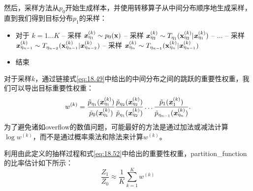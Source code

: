 然后，采样方法从$p_0$开始生成样本，并使用转移算子从中间分布顺序地生成采样，直到我们得到目标分布$p_1$的采样：
\begin{itemize}
	\item 对于 $k=1 \dots K$ 
		\newline
		\quad\quad -- 采样 $ \boldsymbol{\mathit{x}}_{\eta_1}^{(k)} \sim p_0(\mathbf{x}) $
		\newline
		\quad\quad -- 采样 $ \boldsymbol{\mathit{x}}_{\eta_2}^{(k)} \sim T_{\eta_1}(\mathbf{x}_{\eta_2}^{(k)} | \boldsymbol{\mathit{x}}_{\eta_1}^{(k)} ) $
		\newline
		\quad\quad -- $\dots$
		\newline
		\quad\quad -- 采样 $ \boldsymbol{\mathit{x}}_{\eta_{n-1}}^{(k)} \sim T_{\eta_{n-2}}(\mathbf{x}_{\eta_{n-1}}^{(k)} | \boldsymbol{\mathit{x}}_{\eta_{n-2}}^{(k)} ) $
		\newline
		\quad\quad -- 采样 $ \boldsymbol{\mathit{x}}_{\eta_n}^{(k)} \sim T_{\eta_{n-1}}(\mathbf{x}_{\eta_n}^{(k)} | \boldsymbol{\mathit{x}}_{\eta_{n-1}}^{(k)} ) $
	\item 结束
\end{itemize}


对于采样$k$，通过链接式\ref{eq:18.49}中给出的中间分布之间的跳跃的重要性权重，我们可以导出目标重要性权重：
\begin{equation}
\label{eq:18.52}
	w^{(k)} = \frac{ \tilde{p}_{\eta_1} ( \boldsymbol{\mathit{x}}_{\eta_1}^{(k)} )  }{  \tilde{p}_{0} ( \boldsymbol{\mathit{x}}_{\eta_1}^{(k)} )  }
\frac{ \tilde{p}_{\eta_2} ( \boldsymbol{\mathit{x}}_{\eta_2}^{(k)} )  }{  \tilde{p}_{\eta_1} ( \boldsymbol{\mathit{x}}_{\eta_2}^{(k)} )  }
\dots
\frac{ \tilde{p}_{1} ( \boldsymbol{\mathit{x}}_{1}^{(k)} )  }{  \tilde{p}_{\eta_{n-1}} ( \boldsymbol{\mathit{x}}_{\eta_n}^{(k)} )  } .
\end{equation}
为了避免诸如\gls{overflow}的数值问题，可能最好的方法是通过加法或减法计算$\log w^{(k)}$，而不是通过概率乘法和除法来计算$w^{(k)}$。


利用由此定义的抽样过程和式\ref{eq:18.52}中给出的重要性权重，\gls{partition_function}的比率估计如下所示：
\begin{equation}
	\frac{Z_1}{Z_0} \approx \frac{1}{K} \sum_{k=1}^K w^{(k)}
\end{equation}


